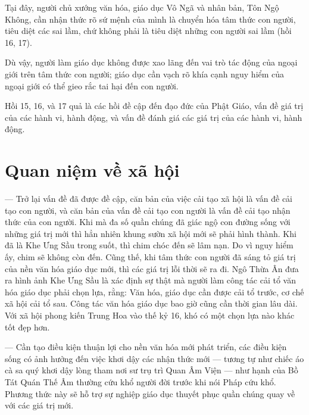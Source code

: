 Tại đây, người chủ xướng văn hóa, giáo dục Vô Ngã và nhân bản, Tôn Ngộ Không, cần nhận thức rõ sứ mệnh của mình là chuyển hóa tâm thức con người, tiêu diệt các sai lầm, chứ không phải là tiêu diệt những con người sai lầm (hồi 16, 17).

Dù vậy, người làm giáo dục không được xao lãng đến vai trò tác động của ngoại giới trên tâm thức con người; giáo dục cần vạch rõ khía cạnh nguy hiểm của ngoại giới có thể gieo rắc tai hại đến con người.

Hồi 15, 16, và 17 quả là các hồi đề cập đến đạo đức của Phật Giáo, vấn đề giá trị của các hành vi, hành động, và vấn đề đánh giá các giá trị của các hành vi, hành động.

\section{Quan niệm về xã hội} %
\label{sec:15_xa_hoi}

--- Trở lại vấn đề đã được đề cập, căn bản của việc cải tạo xã hội là vấn đề cải tạo con người, và căn bản của vấn đề cải tạo con người là vấn đề cải tạo nhận thức của con người. Khi mà đa số quần chúng đã giác ngộ con đường sống với những giá trị mới thì hẳn nhiên khung sườn xã hội mới sẽ phải hình thành. Khi đã là Khe Ưng Sầu trong suốt, thì chim chóc đến sẽ lâm nạn. Do vì nguy hiểm ấy, chim sẽ không còn đến. Cũng thế, khi tâm thức con người đã sáng tỏ giá trị của nền văn hóa giáo dục mới, thì các giá trị lỗi thời sẽ ra đi. Ngô Thừa Ân đưa ra hình ảnh Khe Ưng Sầu là xác định sự thật mà người làm công tác cải tổ văn hóa giáo dục phải chọn lựa, rằng: Văn hóa, giáo dục cần được cải tổ trước, cơ chế xã hội cải tổ sau. Công tác văn hóa giáo dục bao giờ cũng cần thời gian lâu dài. Với xã hội phong kiến Trung Hoa vào thế kỷ 16, khó có một chọn lựa nào khác tốt đẹp hơn.

--- Cần tạo điều kiện thuận lợi cho nền văn hóa mới phát triển, các điều kiện sống có ảnh hưởng đến việc khơi dậy các nhận thức mới --- tương tự như chiếc áo cà sa quý khơi dậy lòng tham nơi sư trụ trì Quan Âm Viện --- như hạnh của Bồ Tát Quán Thế Âm thường cứu khổ người đời trước khi nói Pháp cứu khổ. Phương thức này sẽ hỗ trợ sự nghiệp giáo dục thuyết phục quần chúng quay về với các giá trị mới.
